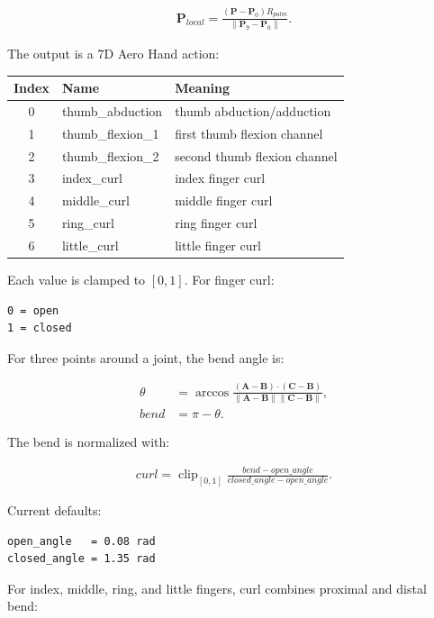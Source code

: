 \documentclass[11pt]{article}
\begin{document}
\begin{align}
\mathbf{P}_{local}
  = \frac{(\mathbf{P}-\mathbf{P}_0)R_{palm}}{\|\mathbf{P}_9-\mathbf{P}_0\|}.
\end{align}

The output is a 7D Aero Hand action:

\begin{center}
\begin{tabular}{cll}
\toprule
Index & Name & Meaning \\
\midrule
0 & thumb\_abduction & thumb abduction/adduction \\
1 & thumb\_flexion\_1 & first thumb flexion channel \\
2 & thumb\_flexion\_2 & second thumb flexion channel \\
3 & index\_curl & index finger curl \\
4 & middle\_curl & middle finger curl \\
5 & ring\_curl & ring finger curl \\
6 & little\_curl & little finger curl \\
\bottomrule
\end{tabular}
\end{center}

Each value is clamped to $[0,1]$. For finger curl:

\begin{lstlisting}
0 = open
1 = closed
\end{lstlisting}

For three points around a joint, the bend angle is:

\begin{align}
\theta
  &= \arccos
     \frac{(\mathbf{A}-\mathbf{B})\cdot(\mathbf{C}-\mathbf{B})}
          {\|\mathbf{A}-\mathbf{B}\|\|\mathbf{C}-\mathbf{B}\|}, \\
bend &= \pi-\theta.
\end{align}

The bend is normalized with:

\begin{align}
curl
  = \operatorname{clip}_{[0,1]}
    \frac{bend-open\_angle}{closed\_angle-open\_angle}.
\end{align}

Current defaults:

\begin{lstlisting}
open_angle   = 0.08 rad
closed_angle = 1.35 rad
\end{lstlisting}

For index, middle, ring, and little fingers, curl combines proximal and distal
bend:
\end{document}
